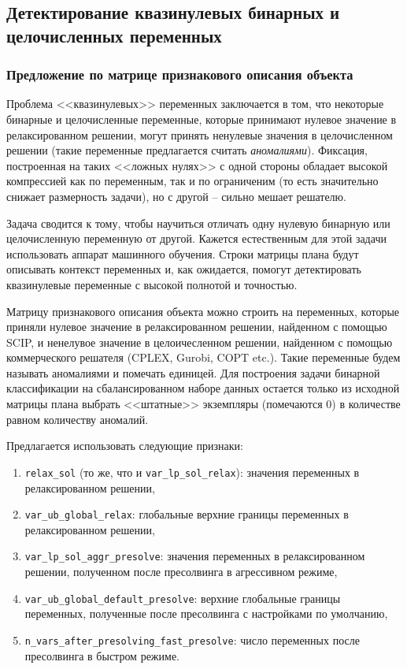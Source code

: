 \documentclass[%
	11pt,
	a4paper,
	utf8,
		]{article}
\begin{document}
\subsection{Детектирование квазинулевых бинарных и целочисленных переменных}

\subsubsection{Предложение по матрице признакового описания объекта}

Проблема <<квазинулевых>> переменных заключается в том, что некоторые бинарные и целочисленные переменные, которые принимают нулевое значение в релаксированном решении, могут принять ненулевые значения в целочисленном решении (такие переменные предлагается считать \emph{аномалиями}). Фиксация, построенная на таких <<ложных нулях>> с одной стороны обладает высокой компрессией как по переменным, так и по ограниченим (то есть значительно снижает размерность задачи), но с другой -- сильно мешает решателю.

Задача сводится к тому, чтобы научиться отличать одну нулевую бинарную или целочисленную переменную от другой. Кажется естественным для этой задачи использовать аппарат машинного обучения. Строки матрицы плана будут описывать контекст переменных и, как ожидается, помогут детектировать квазинулевые переменные с высокой полнотой и точностью.

Матрицу признакового описания объекта можно строить на переменных, которые приняли нулевое значение в релаксированном решении, найденном с помощью SCIP, и ненелувое значение в целоичесленном решении, найденном с помощью коммерческого решателя (CPLEX, Gurobi, COPT etc.). Такие переменные будем называть аномалиями и помечать единицей. Для построения задачи бинарной классификации на сбалансированном наборе данных остается только из исходной матрицы плана выбрать <<штатные>> экземпляры (помечаются 0) в количестве равном количеству аномалий.

Предлагается использовать следующие признаки:
\begin{enumerate}
	\item \verb|relax_sol| (то же, что и \verb|var_lp_sol_relax|): значения переменных в релаксированном решении,
	
	\item \verb|var_ub_global_relax|: глобальные верхние границы переменных в релаксированном решении,
	
	\item \verb|var_lp_sol_aggr_presolve|: значения переменных в релаксированном решении, полученном после пресолвинга в агрессивном режиме,
	
	\item \verb|var_ub_global_default_presolve|: верхние глобальные границы переменных, полученные после пресолвинга с настройками по умолчанию,
	
	\item \verb|n_vars_after_presolving_fast_presolve|: число переменных после пресолвинга в быстром режиме.
\end{enumerate}
\end{document}
